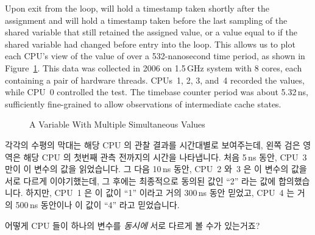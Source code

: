Upon exit from the loop,  will hold a timestamp
taken shortly after the assignment and  will hold
a timestamp taken before the last sampling of the shared variable
that still retained the assigned value, or a value equal to 
if the shared variable had changed before entry into the loop.
This allows us to plot each CPU's view of the value of 
over a 532-nanosecond time period, as shown in
Figure~\ref{fig:memorder:A Variable With Multiple Simultaneous Values}.
This data was collected in 2006 on 1.5\,GHz  system with 8 cores,
each containing a pair of hardware threads.
CPUs~1, 2, 3, and~4 recorded the values, while CPU~0 controlled the test.
The timebase counter period was about 5.32\,ns, sufficiently fine-grained
to allow observations of intermediate cache states.
\fi

\begin{figure}[htb]
\centering
{}
\caption{A Variable With Multiple Simultaneous Values}
\label{fig:memorder:A Variable With Multiple Simultaneous Values}
\end{figure}

각각의 수평의 막대는 해당 CPU 의 관찰 결과를 시간대별로 보여주는데, 왼쪽 검은
영역은 해당 CPU 의 첫번째 관측 전까지의 시간을 나타냅니다.
처음 5\,ns 동안, CPU~3 만이 이 변수의 값을 읽었습니다.
그 다음 10\,ns 동안, CPU~2 와~3 은 이 변수의 값을 서로 다르게 이야기했는데, 그
후에는 최종적으로 동의된 값인 ``2'' 라는 값에 합의했습니다.
하지만, CPU~1 은 이 값이 ``1'' 이라고 거의 300\,ns 동안 믿었고, CPU~4 는 거의
500\,ns 동안이나 이 값이 ``4'' 라고 믿었습니다.

\QuickQuiz{}
	어떻게 CPU 들이 하나의 변수를 \emph{동시에} 서로 다르게 볼 수가
	있는거죠?
	\iffalse

